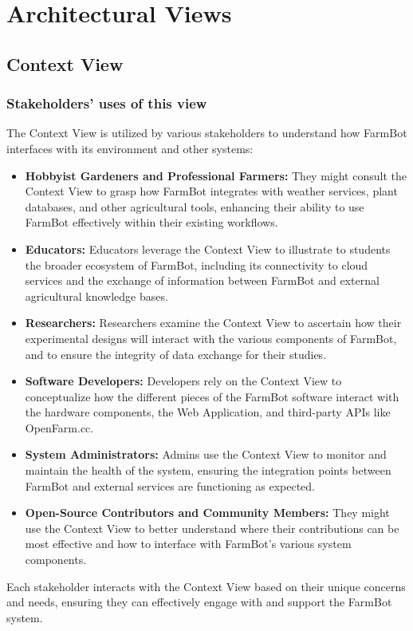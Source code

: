 \chapter{Architectural Views} \label{ArchitecturalViews}

\section{Context View}

\subsection{Stakeholders’ uses of this view}
The Context View is utilized by various stakeholders to understand how FarmBot interfaces with its environment and other systems:
\begin{itemize}
    \item \textbf{Hobbyist Gardeners and Professional Farmers:} They might consult the Context View to grasp how FarmBot integrates with weather services, plant databases, and other agricultural tools, enhancing their ability to use FarmBot effectively within their existing workflows.
    \item \textbf{Educators:} Educators leverage the Context View to illustrate to students the broader ecosystem of FarmBot, including its connectivity to cloud services and the exchange of information between FarmBot and external agricultural knowledge bases.
    \item \textbf{Researchers:} Researchers examine the Context View to ascertain how their experimental designs will interact with the various components of FarmBot, and to ensure the integrity of data exchange for their studies.
    \item \textbf{Software Developers:}  Developers rely on the Context View to conceptualize how the different pieces of the FarmBot software interact with the hardware components, the Web Application, and third-party APIs like OpenFarm.cc.
    \item \textbf{System Administrators:} Admins use the Context View to monitor and maintain the health of the system, ensuring the integration points between FarmBot and external services are functioning as expected.
    \item \textbf{Open-Source Contributors and Community Members:} They might use the Context View to better understand where their contributions can be most effective and how to interface with FarmBot's various system components.
\end{itemize}
Each stakeholder interacts with the Context View based on their unique concerns and needs, ensuring they can effectively engage with and support the FarmBot system.

